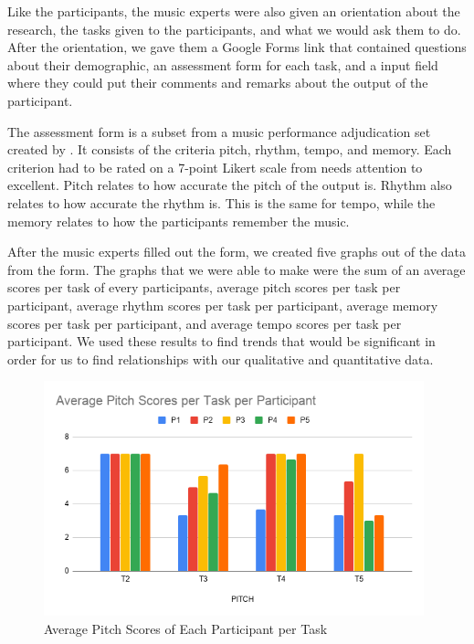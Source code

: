 Like the participants, the music experts were also given an orientation about the research, the tasks given to the participants, and what we would ask them to do. After the orientation, we gave them a Google Forms link that contained questions about their demographic, an assessment form for each task, and a input field where they could put their comments and remarks about the output of the participant.

The assessment form is a subset from a music performance adjudication set created by . It consists of the criteria pitch, rhythm, tempo, and memory. Each criterion had to be rated on a 7-point Likert scale from needs attention to excellent. Pitch relates to how accurate the pitch of the output is. Rhythm also relates to how accurate the rhythm is. This is the same for tempo, while the memory relates to how the participants remember the music.

After the music experts filled out the form, we created five graphs out of the data from the form. The graphs that we were able to make were the sum of an average scores per task of every participants, average pitch scores per task per participant, average rhythm scores per task per participant, average memory scores per task per participant, and average tempo scores per task per participant. We used these results to find trends that would be significant in order for us to find relationships with our qualitative and quantitative data.

\begin{figure}[H]
    \centering
    \includegraphics[width=11cm]{figures/Results/AveragePitch.png}
    \caption{Average Pitch Scores of Each Participant per Task}
    \label{fig:AveragePitch}
\end{figure}

